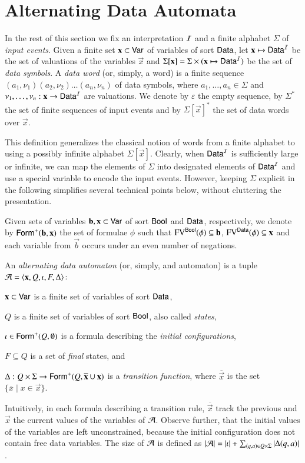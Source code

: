 \documentclass{llncs}
\begin{document}
\section{Alternating Data Automata}

In the rest of this section we fix an interpretation $\mathcal{I}$ and a finite
alphabet $\Sigma$ of \emph{input events}. Given a finite set $\mathbf x
\subset \mathsf{Var}$ of variables of sort $\mathsf{Data}$, let $\mathbf x \mapsto
\mathsf{Data}^{\mathcal{I}}$ be the set of valuations of the variables $\vec{x}$ and
$\Sigma[\mathbf x] = \Sigma \times (\mathbf x \mapsto \mathsf{Data}^{\mathcal{I}})$ be the
set of \emph{data symbols}. A \emph{data word} (or, simply, a word) is
a finite sequence $(a_1,\nu_1)(a_2,\nu_2) \ldots (a_n,\nu_n)$ of data
symbols, where $a_1,\ldots,a_n \in \Sigma$ and $\nu_1,\ldots,\nu_n :
\mathbf x \rightarrow \mathsf{Data}^{\mathcal{I}}$ are valuations. We denote by
$\varepsilon$ the empty sequence, by $\Sigma^*$ the set of finite
sequences of input events and by $\Sigma[\vec{x}]^*$ the set of data
words over $\vec{x}$.

This definition generalizes the classical notion of words from a
finite alphabet to using a possibly infinite alphabet
$\Sigma[\vec{x}]$. Clearly, when $\mathsf{Data}^{\mathcal{I}}$ is sufficiently large or
infinite, we can map the elements of $\Sigma$ into designated elements
of $\mathsf{Data}^{\mathcal{I}}$ and use a special variable to encode the input
events. However, keeping $\Sigma$ explicit in the following simplifies
several technical points below, without cluttering the presentation.

Given sets of variables $\mathbf b,\mathbf x \subset \mathsf{Var}$ of sort
$\mathsf{Bool}$ and $\mathsf{Data}$, respectively, we denote by
$\mathsf{Form}^+(\mathbf b,\mathbf x)$ the set of formulae $\phi$ such that
$\mathrm{FV}^{\mathsf{Bool}}(\phi) \subseteq \mathbf b$, $\mathrm{FV}^{\mathsf{Data}}(\phi) \subseteq
\mathbf x$ and each variable from $\vec{b}$ occurs under an even number
of negations. 

An \emph{alternating data automaton} (or, simply, and automaton) is a
tuple $\mathcal{A} = \left\langle \mathbf x,Q,\iota,F,\Delta \right\rangle$: \begin{compactitem}
%
\item $\mathbf x \subset \mathsf{Var}$ is a finite set of variables of sort
  $\mathsf{Data}$,
%
\item $Q$ is a finite set of variables of sort $\mathsf{Bool}$, also called
  \emph{states},
%
\item $\iota \in \mathsf{Form}^+(Q,\emptyset)$ is a formula describing the
  \emph{initial configurations},
%
\item $F \subseteq Q$ is a set of \emph{final} states, and
%
\item $\Delta : Q \times \Sigma \rightarrow
  \mathsf{Form}^+(Q,\overline{\mathbf x}\cup\mathbf x)$ is a \emph{transition
    function}, where $\overline{\vec{x}}$ is the set $\{\overline{x}
  \mid x \in \vec{x}\}$.
\end{compactitem}
Intuitively, in each formula describing a transition rule,
$\overline{\vec{x}}$ track the previous and $\vec{x}$ the current
values of the variables of $\mathcal{A}$. Observe further, that the initial
values of the variables are left unconstrained, because the initial
configuration does not contain free data variables. The size of $\mathcal{A}$
is defined as ${|{\mathcal{A}}|} = {|{\iota}|} + \sum_{(q,a) \in
  Q\times\Sigma}{|{\Delta(q,a)}|}$.
\end{document}
